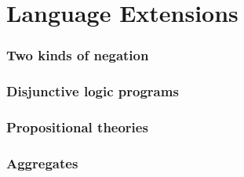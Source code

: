 \part{Language Extensions}
\section{Two kinds of negation}

\section{Disjunctive logic programs}

\section{Propositional theories}

\section{Aggregates}

%
